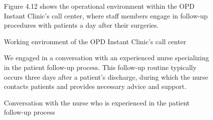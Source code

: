 \documentclass[12pt,oneside,openright,a4paper]{cpe-english-project}
\begin{document}
      \begin{figure}[!h]
        \centering
        \caption{Working environment of the OPD Instant Clinic's call center}\label{fig:Interview_2}
        \begin{flushleft}
          \qquad Figure 4.12 shows the operational environment within the OPD Instant Clinic's call center, where staff members engage in follow-up procedures with patients a day after their surgeries. \par
        \end{flushleft}
      \end{figure}
      \begin{figure}
        \centering
        \caption{Conversation with the nurse who is experienced in the patient follow-up process}\label{fig:Interview_3}
        \begin{flushleft}
          \qquad We engaged in a conversation with an experienced nurse specializing in the patient follow-up process. This follow-up routine typically occurs three days after a patient's discharge, during which the nurse contacts patients and provides necessary advice and support. \par
        \end{flushleft}
      \end{figure}
\end{document}
